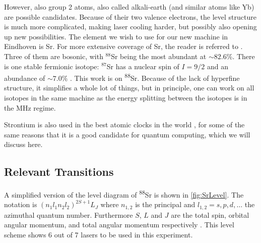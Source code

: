 However, also group 2 atoms, also called alkali-earth (and similar atoms like Yb) are possible candidates. Because of their two valence electrons, the level structure is much more complicated, making laser cooling harder, but possibly also opening up new possibilities. The element we wish to use for our new machine in Eindhoven is Sr. For more extensive coverage of Sr, the reader is referred to \cite{Stellmer2013}. Three of them are bosonic, with ${}^{88}$Sr being the most abundant at $\sim82.6\%$. There is one stable fermionic isotope: ${}^{87}$Sr has a nuclear spin of $I=9/2$ and an abundance of $\sim7.0\%$ \cite{Coursey1999}. This work is on \textsuperscript{88}Sr. Because of the lack of hyperfine structure, it simplifies a whole lot of things, but in principle, one can work on all isotopes in the same machine as the energy splitting between the isotopes is in the MHz regime. 

Strontium is also used in the best atomic clocks in the world \cite{Bloom2014}, for some of the same reasons that it is a good candidate for quantum computing, which we will discuss here. 

\subsection{Relevant Transitions}

A simplified version of the level diagram of \textsuperscript{88}Sr is shown in \cref{fig:SrLevel}. The notation is $(n_1l_1 n_2l_2)^{2S+1}L_J$ where $n_{1,2}$ is the principal and $l_{1,2} = s, p, d, \ldots$ the azimuthal quantum number. Furthermore $S$, $L$ and $J$ are the total spin, orbital angular momentum, and total angular momentum respectively \cite{Cowan1981}.  This level scheme shows 6 out of 7 lasers to be used in this experiment. 

